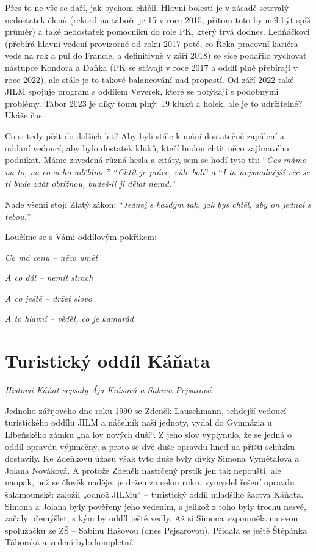 Přes to ne vše se daří, jak bychom chtěli. Hlavní bolestí je v zásadě
setrvalý nedostatek členů (rekord na táboře je 15 v roce 2015, přitom
toto by měl být spíš průměr) a také nedostatek pomocníků do role PK,
který trvá dodnes. Ledňáčkovi (přebírá hlavní vedení provizorně od roku
2017 poté, co Řeka pracovní kariéra vede na rok a půl do Francie, a
definitivně v září 2018) se sice podařilo vychovat nástupce Kondora a
Daňka (PK se stávají v roce 2017 a oddíl plně přebírají v roce 2022),
ale stále je to takové balancování nad propastí. Od září 2022 také JILM
spojuje program s oddílem Veverek, které se potýkají s podobnými
problémy. Tábor 2023 je díky tomu plný: 19 kluků a holek, ale je to
udržitelné? Ukáže čas.

Co si tedy přát do dalších let? Aby byli stále k mání dostatečně
zapálení a oddaní vedoucí, aby bylo dostatek kluků, kteří budou chtít
něco zajímavého podnikat. Máme zavedená různá hesla a citáty, sem se
hodí tyto tři: ``\emph{Čas máme na to, na co si ho uděláme},''
``\emph{Chtít je práce, vůle bolí}'' a ``\emph{I ta nejsnadnější věc se
ti bude zdát obtížnou, budeš-li ji dělat nerad.}''

Nade všemi stojí Zlatý zákon: ``\emph{Jednej s každým tak, jak bys
chtěl, aby on jednal s tebou.}''

Loučíme se s Vámi oddílovým pokřikem:

\emph{Co má cenu -- něco umět}

\emph{A co dál -- nemít strach}

\emph{A co ještě -- držet slovo}

\emph{A to hlavní -- vědět, co je kamarád}

\section{Turistický oddíl
Káňata}\label{turistickuxfd-odduxedl-kuxe1ux148ata}

\emph{Historii Káňat sepsaly Ája Krásová a Sabina Pejsarová}

Jednoho zářijového dne roku 1990 se Zdeněk Lauschmann, tehdejší vedoucí
turistického oddílu JILM a náčelník naší jednoty, vydal do Gymnázia u
Libeňského zámku „na lov nových duší``. Z jeho slov vyplynulo, že se
jedná o oddíl opravdu výjimečný, a proto se dvě duše opravdu hned na
příští schůzku dostavily. Ke Zdeňkovu úžasu však tyto duše byly dívky
Simona Vymětalová a Jolana Nováková. A protože Zdeněk nastrčený prstík
jen tak nepouští, ale naopak, než se člověk naděje, je držen za celou
ruku, vymyslel řešení opravdu šalamounské: založil „odnož JILMu`` --
turistický oddíl mladšího žactva Káňata. Simona a Jolana byly pověřeny
jeho vedením, a jelikož z toho byly trochu nesvé, začaly přemýšlet, s
kým by oddíl ještě vedly. Až si Simona vzpomněla na svou spolužačku ze
ZŠ -- Sabinu Hašovou (dnes Pejsarovou). Přidala se ještě Štěpánka
Táborská a vedení bylo kompletní.

